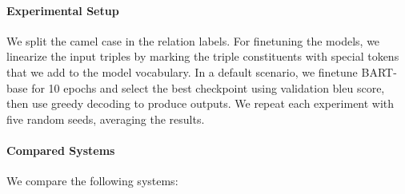 \paragraph{Experimental Setup} We split the camel case in the relation labels. For finetuning the models, we linearize the input triples by marking the triple constituents with special tokens that we add to the model vocabulary. In a default scenario, we finetune BART-base \cite{lewisBARTDenoisingSequencetoSequence2019} for 10 epochs and select the best checkpoint using validation \acs{bleu} score, then use greedy decoding to produce outputs. We repeat each experiment with five random seeds, averaging the results.


\paragraph{Compared Systems} We compare the following systems:
